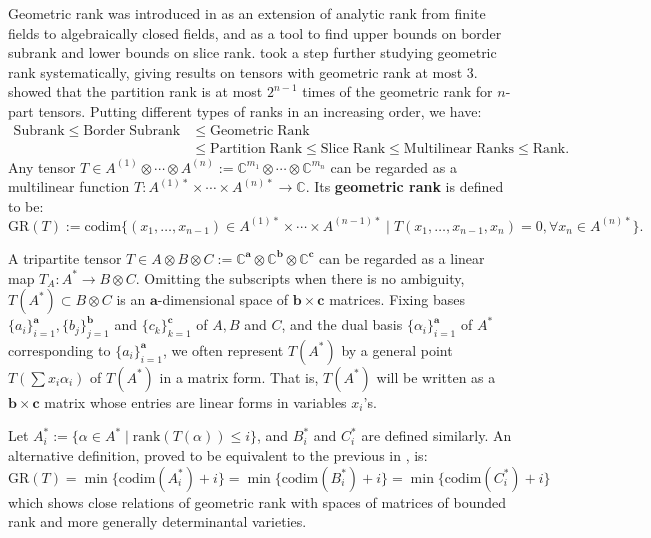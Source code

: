 \documentclass[10pt]{article} %
\newcommand{\aaa}{\mathbf{a}}
\newcommand{\bbb}{\mathbf{b}}
\newcommand{\ccc}{\mathbf{c}}
\newcommand{\GR}{\mathrm{GR}}
\newcommand{\BC}{\mathbb{C}}
\newcommand{\ot}{\otimes}
\theoremstyle{definition}
\begin{document}
Geometric rank was introduced in \cite{KMZ20} as an extension of analytic rank from finite fields to algebraically closed fields, and as a tool to find upper bounds on border subrank and lower bounds on slice rank. \cite{GL20} took a step further studying geometric rank systematically, giving results on tensors with geometric rank at most 3. \cite{CM21} showed that the partition rank is at most $2^{n-1}$ times of the geometric rank for $n$-part tensors. Putting different types of ranks in an increasing order, we have:
\begin{align*}
    \mathrm{Subrank}\leq\mathrm{Border\;Subrank}&\leq\mathrm{Geometric\;Rank}\\
    &\leq\mathrm{Partition\;Rank}\leq\mathrm{Slice\;Rank}\leq\mathrm{Multilinear\;Ranks}\leq\mathrm{Rank}.
\end{align*}
Any tensor $T\in A^{(1)}\otimes\cdots\otimes A^{(n)}:=\BC^{m_1}\ot\cdots\ot\BC^{m_n}$ can be regarded as a multilinear function $T:A^{(1)*}\times \cdots \times A^{(n)*}\rightarrow \BC$. Its \textbf{geometric rank} is defined to be:
$$\GR(T):=\mathrm{codim}\{(x_1,\dots,x_{n-1})\in A^{(1)*}\times \cdots \times A^{(n-1)*}\mid T(x_1,\dots,x_{n-1},x_n)=0,\forall x_n\in A^{(n)*}\}.$$

A tripartite tensor $T\in A\ot B\ot C:=\BC^{\aaa}\ot\BC^{\bbb}\ot\BC^{\ccc}$ can be regarded as a linear map $T_A:A^*\rightarrow B\ot C$. Omitting the subscripts when there is no ambiguity, $T(A^*)\subset B\ot C$ is an $\aaa$-dimensional space of $\bbb\times\ccc$ matrices. Fixing bases $\{a_i\}_{i=1}^{\aaa},\{b_j\}_{j=1}^{\bbb}$ and $\{c_k\}_{k=1}^{\ccc}$ of $A,B$ and $C$, and the dual basis $\{\alpha_i\}_{i=1}^{\aaa}$ of $A^*$ corresponding to $\{a_i\}_{i=1}^{\aaa}$, we often represent $T(A^*)$ by a general point $T(\sum x_i\alpha_i)$ of $T(A^*)$ in a matrix form. That is, $T(A^*)$ will be written as a $\bbb\times\ccc$ matrix whose entries are linear forms in variables $x_i$'s.

Let $A^*_i:=\{\alpha\in A^*\mid \mathrm{rank}(T(\alpha))\leq i\}$, and $B^*_i$ and $C^*_i$ are defined similarly. An alternative definition, proved to be equivalent to the
previous in \cite[Theorem~3.1]{KMZ20}, is:
\begin{equation}\label{altdef}
    \GR(T)=\min\{\mathrm{codim}(A^*_i)+i\}=\min\{\mathrm{codim}(B^*_i)+i\}=\min\{\mathrm{codim}(C^*_i)+i\}
\end{equation}
which shows close relations of geometric rank with spaces of matrices of bounded rank and more generally determinantal varieties.
\end{document}
